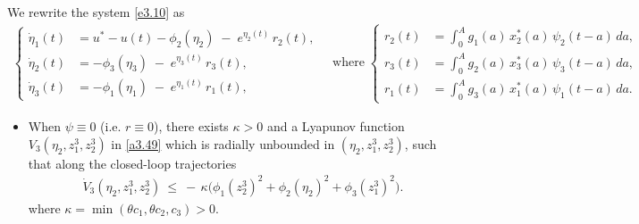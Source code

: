 \documentclass[10pt, a4paper]{amsart}
\makeatletter
\theoremstyle{plain}
\theoremstyle{definition}
\theoremstyle{remark}
\renewenvironment{proof}[1][\proofname]{\par
  \pushQED{\qed}%
  \normalfont \topsep6\p@\@plus6\p@\relax
  \trivlist
  \item[\hskip\labelsep
        \itshape
    #1\ \ref{#1}.]\ignorespaces
}{%
  \popQED\endtrivlist\@endpefalse
}
\numberwithin{equation}{section}
\makeatother
\begin{document}
\begin{proof}[of Lemma \ref{lem3.11}]
We rewrite the system \eqref{e3.10} as
\begin{equation}\label{ae3.67}
\begin{aligned}
\begin{cases}
\dot \eta_1(t) &= u^*-u(t) - \phi_2(\eta_2)\;-\; e^{\eta_2(t)}\,r_2(t),\\
\dot \eta_2(t) &= -\phi_3(\eta_3)\;-\; e^{\eta_3(t)}\,r_3(t),\\
\dot \eta_3(t) &= -\phi_1(\eta_1)\;-\; e^{\eta_1(t)}\,r_1(t),
\end{cases}\quad\text{where}\; \begin{cases}
r_2(t)&=\displaystyle\int_0^A g_1(a)\,x_2^*(a)\,\psi_2(t-a)\,da,\\
r_3(t)&=\displaystyle\int_0^A g_2(a)\,x_3^*(a)\,\psi_3(t-a)\,da,\\
r_1(t)&=\displaystyle\int_0^A g_3(a)\,x_1^*(a)\,\psi_1(t-a)\,da.
\end{cases}
\end{aligned}
\end{equation}
\begin{itemize}
\item When $\psi\equiv 0$ (i.e. $r\equiv 0$), there exists $\kappa>0$ and a Lyapunov function $V_3(\eta_2,z^3_1,z^3_2)$ in \eqref{a3.49} which is radially unbounded in $(\eta_2,z^3_1,z^3_2)$, such that along the closed-loop trajectories 
\begin{align}\label{ae3.68}
\dot V_3(\eta_2, z^3_1, z^3_2)\ \le\ -\,\kappa\Big(\phi_1(z^3_2)^2+\phi_2(\eta_2)^2+\phi_3(z^3_1)^2\Big).
\end{align}
where $\kappa=\min(\theta c_1,\theta c_2,c_3)>0.$


\end{itemize}
\end{proof}
\end{document}

